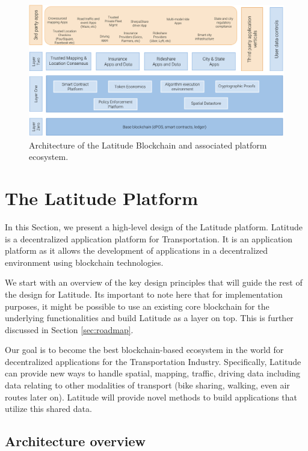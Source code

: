 \begin{figure}[t]
    \centering
    \includegraphics[width=1.00\textwidth]{lat-arch-2.png}
  \caption{Architecture of the Latitude Blockchain and associated platform ecosystem.}
    \label{fig:lat-arch}
\end{figure}

\section{The Latitude Platform}\label{sec:design}

In this Section, we present a high-level design of the Latitude platform. Latitude is a decentralized application
platform for Transportation. It is an application platform as it allows the development of applications in a
decentralized environment using blockchain technologies.

We start with an overview of the key design principles that will guide the rest of the design for Latitude. Its
important to note here that for implementation purposes, it might be possible to use an existing core blockchain for the
underlying functionalities and build Latitude as a layer on top. This is further discussed in Section \ref{sec:roadmap}.

Our goal is to become the best blockchain-based ecosystem in the world for decentralized applications for the
Transportation Industry. Specifically, Latitude can provide new ways to handle spatial, mapping, traffic, driving data
including data relating to other modalities of transport (bike sharing, walking, even air routes later on). Latitude
will provide novel methods to build applications that utilize this shared data.

\subsection{Architecture overview}
\label{sec:arch}

